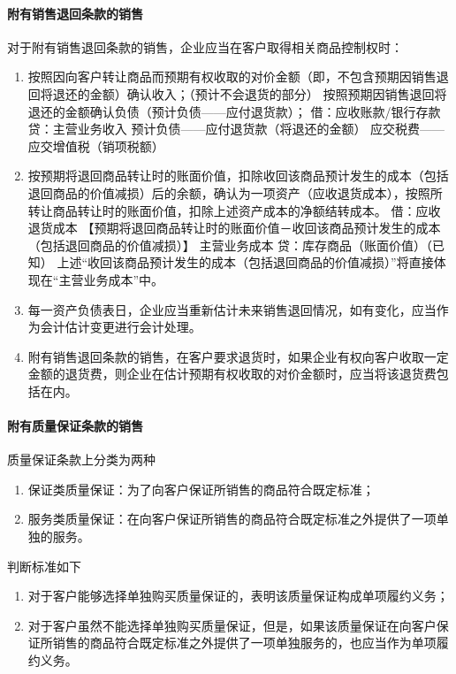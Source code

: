 \documentclass[UTF8,12pt]{ctexart}
\numberwithin{equation}{section} %
\numberwithin{figure}{section}
\numberwithin{table}{section}
\begin{document}
	\paragraph{附有销售退回条款的销售}
	对于附有销售退回条款的销售，企业应当在客户取得相关商品控制权时：
	\begin{enumerate}
		\item 按照因向客户转让商品而预期有权收取的对价金额（即，不包含预期因销售退回将退还的金额）确认收入；（预计不会退货的部分）
		按照预期因销售退回将退还的金额确认负债（预计负债——应付退货款）；
		借：应收账款/银行存款
		贷：主营业务收入
		预计负债——应付退货款（将退还的金额）
		应交税费——应交增值税（销项税额）
		
		\item 按预期将退回商品转让时的账面价值，扣除收回该商品预计发生的成本（包括退回商品的价值减损）后的余额，确认为一项资产（应收退货成本），按照所转让商品转让时的账面价值，扣除上述资产成本的净额结转成本。
		借：应收退货成本
		【预期将退回商品转让时的账面价值－收回该商品预计发生的成本（包括退回商品的价值减损）】
		主营业务成本
		贷：库存商品（账面价值）（已知）
		上述“收回该商品预计发生的成本（包括退回商品的价值减损）”将直接体现在“主营业务成本”中。
		
		\item 每一资产负债表日，企业应当重新估计未来销售退回情况，如有变化，应当作为会计估计变更进行会计处理。
		
		\item 附有销售退回条款的销售，在客户要求退货时，如果企业有权向客户收取一定金额的退货费，则企业在估计预期有权收取的对价金额时，应当将该退货费包括在内。
	\end{enumerate}

	
	
	\paragraph{附有质量保证条款的销售}
	质量保证条款上分类为两种
	\begin{enumerate}
		\item 保证类质量保证：为了向客户保证所销售的商品符合既定标准；
		
		\item 服务类质量保证：在向客户保证所销售的商品符合既定标准之外提供了一项单独的服务。
	\end{enumerate}	

	判断标准如下
	\begin{enumerate}
		\item 对于客户能够选择单独购买质量保证的，表明该质量保证构成单项履约义务；
		
		\item 对于客户虽然不能选择单独购买质量保证，但是，如果该质量保证在向客户保证所销售的商品符合既定标准之外提供了一项单独服务的，也应当作为单项履约义务。
	\end{enumerate}
	
\end{document}
